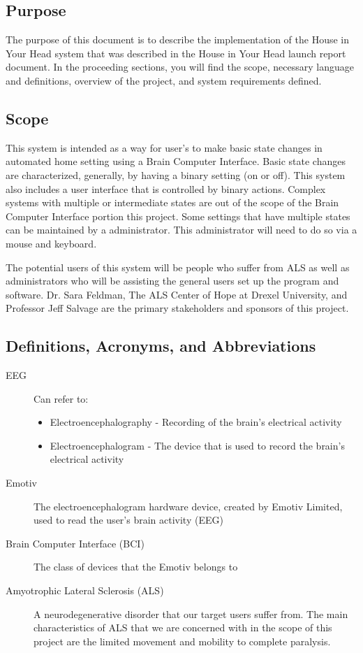 \documentclass{article}
\begin{document}
\subsection{Purpose}
The purpose of this document is to describe the implementation of the House in Your Head system that 
was described in the House in Your Head launch report document. In the proceeding sections, you will 
find the scope, necessary language and definitions, overview of the project, and system requirements 
defined.

\subsection{Scope}

This system is intended as a way for user's to make basic state changes in automated home setting
using a Brain Computer Interface. Basic state changes are characterized, generally, by having a binary 
setting (on or off). This system also includes a user interface that is controlled by binary actions. Complex 
systems with multiple or intermediate states are out of the scope of the Brain Computer Interface portion 
this project. Some settings that have multiple states can be maintained by a administrator. This 
administrator will need to do so via a mouse and keyboard. 

The potential users of this system will be people who suffer from ALS as well as administrators 
who will be assisting the general users set up the program and software. Dr. Sara Feldman, The ALS 
Center of Hope at Drexel University, and Professor Jeff Salvage are the primary stakeholders and 
sponsors of this project.

\subsection{Definitions, Acronyms, and Abbreviations}
\begin{description}
    \item[EEG] Can refer to:
        \begin{itemize}
            \item Electroencephalography - Recording of the brain's electrical
                activity 
	        \item Electroencephalogram - The device that is used to record the
	            brain's electrical activity
        \end{itemize}
    \item[Emotiv] The electroencephalogram hardware device, created by Emotiv
        Limited, used to read the user's brain activity (EEG)
    \item[Brain Computer Interface (BCI)] The class of devices that the Emotiv
        belongs to
    \item[Amyotrophic Lateral Sclerosis (ALS)] A neurodegenerative disorder
        that our target users suffer from. The main characteristics of ALS
        that we are concerned with in the scope of this project are the
        limited movement and mobility to complete paralysis.
\end{description}
\end{document}
